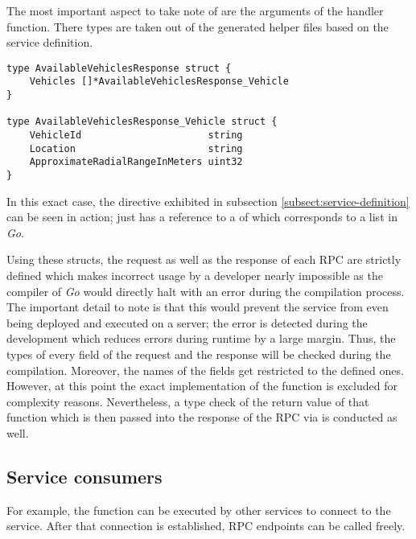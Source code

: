 \documentclass[12pt,a4paper,twoside]{report}
\begin{document}
The most important aspect to take note of are the arguments of the handler function.
There types are taken out of the generated helper files based on the service definition.

\begin{lstlisting}[title=services/fleet-monitor/proto/fleet-monitor.pb.go]
type AvailableVehiclesResponse struct {
	Vehicles []*AvailableVehiclesResponse_Vehicle
}

type AvailableVehiclesResponse_Vehicle struct {
	VehicleId                      string
	Location                       string
	ApproximateRadialRangeInMeters uint32
}
\end{lstlisting}

In this exact case, the  directive exhibited in subsection
\ref{subsect:service-definition} can be seen in action;
 just has a reference to a  of
 which corresponds to a list in \textit{Go}.

Using these structs, the request as well as the response of each RPC
are strictly defined which makes incorrect usage by a developer nearly impossible
as the compiler of \textit{Go} would directly halt with an error during the
compilation process.
The important detail to note is that this would prevent the service from
even being deployed and executed on a server; the error is detected during
the development which reduces errors during runtime by a large margin.
Thus, the types of every field of the request and the response will be checked
during the compilation. Moreover, the names of the fields get restricted
to the defined ones.
However, at this point the exact implementation of the function
 is excluded for complexity reasons.
Nevertheless, a type check of the return value of that function which is then
passed into the response of the RPC via  is conducted as well.

\subsection{Service consumers}

For example, the function  can be executed by
other services to connect to the  service. After that
connection is established, RPC endpoints can be called freely.
\end{document}
